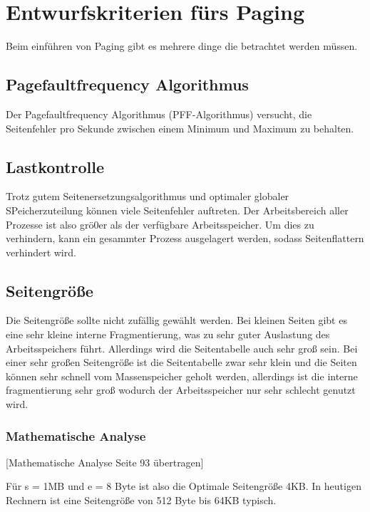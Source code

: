 \section{Entwurfskriterien fürs Paging}

Beim einführen von Paging gibt es mehrere dinge die betrachtet werden müssen.

\subsection{Pagefaultfrequency Algorithmus}

Der Pagefaultfrequency Algorithmus (PFF-Algorithmus) versucht, die Seitenfehler pro Sekunde zwischen einem Minimum und Maximum zu behalten. 

\subsection{Lastkontrolle}

Trotz gutem Seitenersetzungsalgorithmus und optimaler globaler SPeicherzuteilung können viele Seitenfehler auftreten. Der Arbeitsbereich aller Prozesse ist also grö0er als der verfügbare Arbeitsspeicher. Um dies zu verhindern, kann ein gesammter Prozess ausgelagert werden, sodass Seitenflattern verhindert wird.

\subsection{Seitengröße}

Die Seitengröße sollte nicht zufällig gewählt werden. Bei kleinen Seiten gibt es eine sehr kleine interne Fragmentierung, was zu sehr guter Auslastung des Arbeitsspeichers führt. Allerdings wird die Seitentabelle auch sehr groß sein. Bei einer sehr großen Seitengröße ist die Seitentabelle zwar sehr klein und die Seiten können sehr schnell vom Massenspeicher geholt werden, allerdings ist die interne fragmentierung sehr groß wodurch der Arbeitsspeicher nur sehr schlecht genutzt wird.

\subsubsection*{Mathematische Analyse}

[Mathematische Analyse Seite 93 übertragen]

Für s = 1MB und e = 8 Byte ist also die Optimale Seitengröße 4KB. In heutigen Rechnern ist eine Seitengröße von 512 Byte bis 64KB typisch.
